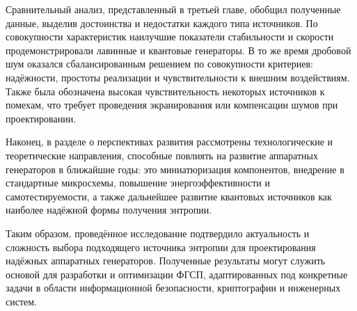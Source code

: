 Сравнительный анализ, представленный в третьей главе, обобщил полученные
данные, выделив достоинства и недостатки каждого типа источников. По
совокупности характеристик наилучшие показатели стабильности и скорости
продемонстрировали лавинные и квантовые генераторы. В то же время
дробовой шум оказался сбалансированным решением по совокупности
критериев: надёжности, простоты реализации и чувствительности к внешним
воздействиям. Также была обозначена высокая чувствительность некоторых
источников к помехам, что требует проведения экранирования или
компенсации шумов при проектировании.

Наконец, в разделе о перспективах развития рассмотрены технологические и
теоретические направления, способные повлиять на развитие аппаратных
генераторов в ближайшие годы: это миниатюризация компонентов, внедрение
в стандартные микросхемы, повышение энергоэффективности и
самотестируемости, а также дальнейшее развитие квантовых источников как
наиболее надёжной формы получения энтропии.

Таким образом, проведённое исследование подтвердило актуальность и
сложность выбора подходящего источника энтропии для проектирования
надёжных аппаратных генераторов. Полученные результаты могут служить
основой для разработки и оптимизации ФГСП, адаптированных под конкретные
задачи в области информационной безопасности, криптографии и инженерных
систем.

